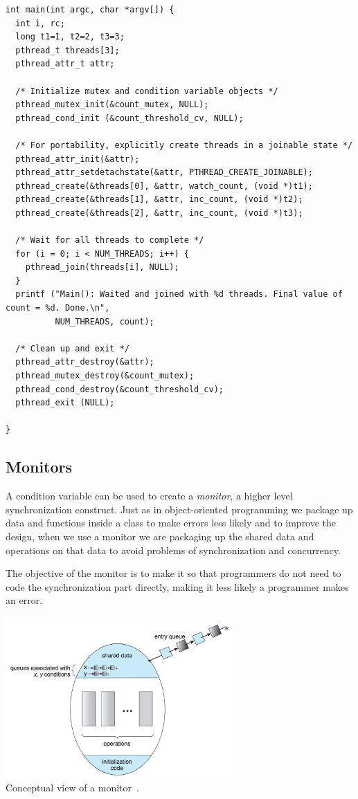 {\begin{verbatim}
int main(int argc, char *argv[]) {
  int i, rc; 
  long t1=1, t2=2, t3=3;
  pthread_t threads[3];
  pthread_attr_t attr;

  /* Initialize mutex and condition variable objects */
  pthread_mutex_init(&count_mutex, NULL);
  pthread_cond_init (&count_threshold_cv, NULL);

  /* For portability, explicitly create threads in a joinable state */
  pthread_attr_init(&attr);
  pthread_attr_setdetachstate(&attr, PTHREAD_CREATE_JOINABLE);
  pthread_create(&threads[0], &attr, watch_count, (void *)t1);
  pthread_create(&threads[1], &attr, inc_count, (void *)t2);
  pthread_create(&threads[2], &attr, inc_count, (void *)t3);

  /* Wait for all threads to complete */
  for (i = 0; i < NUM_THREADS; i++) {
    pthread_join(threads[i], NULL);
  }
  printf ("Main(): Waited and joined with %d threads. Final value of count = %d. Done.\n", 
          NUM_THREADS, count);

  /* Clean up and exit */
  pthread_attr_destroy(&attr);
  pthread_mutex_destroy(&count_mutex);
  pthread_cond_destroy(&count_threshold_cv);
  pthread_exit (NULL);

}
\end{verbatim}
}

\subsection*{Monitors}
A condition variable can be used to create a \textit{monitor}, a higher level synchronization construct. Just as in object-oriented programming we package up data and functions inside a class to make errors less likely and to improve the design, when we use a monitor we are packaging up the shared data and operations on that data to avoid problems of synchronization and concurrency.

The objective of the monitor is to make it so that programmers do not need to code the synchronization part directly, making it less likely a programmer makes an error.

\begin{center}
\includegraphics[width=0.65\textwidth]{images/sync-monitor.png}\\
Conceptual view of a monitor~\cite{osc}.
\end{center}

